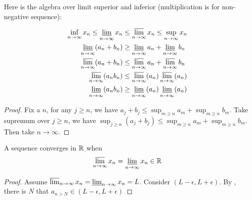 \begin{theorem}
    Here is the algebra over limit superior and inferior (multiplication is for non-negative sequence):
    
    \begin{equation}
        \begin{aligned}
        \inf_{n \rightarrow \infty} x_n \leq \varliminf_{n \rightarrow \infty} x_n &\leq \varlimsup_{n \rightarrow \infty} x_n \leq \sup_{n \rightarrow \infty} x_n \\
        \varliminf_{n \rightarrow \infty} (a_n + b_n) &\geq \varliminf_{n \rightarrow \infty} a_n + \varliminf_{n \rightarrow \infty} b_n \\
        \varlimsup_{n \rightarrow \infty} (a_n + b_n) &\leq \varlimsup_{n \rightarrow \infty} a_n + \varlimsup_{n \rightarrow \infty} b_n \\
        \varlimsup_{n \rightarrow \infty} (a_n  b_n) &\leq \varlimsup_{n \rightarrow \infty} (a_n) \varlimsup_{n \rightarrow \infty} (a_n) \\
        \varliminf_{n \rightarrow \infty} (a_n  b_n) &\geq \varliminf_{n \rightarrow \infty} (a_n) \varliminf_{n \rightarrow \infty} (a_n)
    \end{aligned}
    \end{equation}
\end{theorem}
\begin{proof}
    Fix a $n$, for any $j \geq n$, we have $a_j + b_j \leq \sup_{m\geq n} a_m + \sup_{m\geq n} b_m$. Take supremum over $j \geq n$, we have $\sup_{j \geq n} (a_j + b_j ) \leq \sup_{m\geq n} a_m + \sup_{m\geq n} b_m$. Then take $n \rightarrow \infty$.
\end{proof}



\begin{theorem}
    A sequence converges in $\mathbb{R}$ when 
    \begin{equation}
        \varlimsup_{n\rightarrow \infty} x_n = \varliminf_{n\rightarrow \infty} x_n \in \mathbb{R}
    \end{equation}
\end{theorem}
\begin{proof}
    Assume $\varlimsup_{n\rightarrow \infty} x_n = \varliminf_{n\rightarrow \infty} x_n = L$. Consider $(L - \epsilon, L + \epsilon)$. By , there is $N$ that $a_{n > N} \in (L - \epsilon, L + \epsilon)$
\end{proof}

